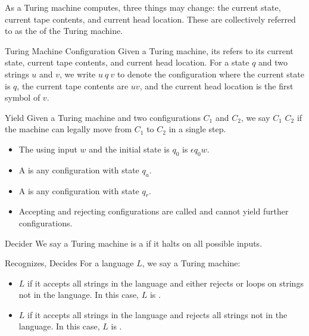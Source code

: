 As a Turing machine computes, three things may change: the current state, current tape contents, and current head location. These are collectively referred to as the  of the Turing machine.

\begin{dfnbox}{Turing Machine Configuration}{}
    Given a Turing machine, its  refers to its current state, current tape contents, and current head location. For a state $q$ and two strings $u$ and $v$, we write $u\ q\ v$ to denote the configuration where the current state is $q$, the current tape contents are $uv$, and the current head location is the first symbol of $v$.
\end{dfnbox}

\begin{dfnbox}{Yield}{}
    Given a Turing machine and two configurations $C_1$ and $C_2$, we say $C_1$  $C_2$ if the machine can legally move from $C_1$ to $C_2$ in a single step.
\end{dfnbox}

\begin{itemize}
    \item The  using input $w$ and the initial state is $q_0$ is $\epsilon q_0w$.
    \item A  is any configuration with state $q_a$.
    \item A  is any configuration with state $q_r$.
    \item Accepting and rejecting configurations are called  and cannot yield further configurations.
\end{itemize}

\begin{dfnbox}{Decider}{}
    We say a Turing machine is a  if it halts on all possible inputs.
\end{dfnbox}

\begin{dfnbox}{Recognizes, Decides}{}
    For a language $L$, we say a Turing machine:
    \begin{itemize}
        \item {} $L$ if it accepts all strings in the language and either rejects or loops on strings not in the language. In this case, $L$ is .
        \item {} $L$ if it accepts all strings in the language and rejects all strings not in the language. In this case, $L$ is .
    \end{itemize}
\end{dfnbox}

